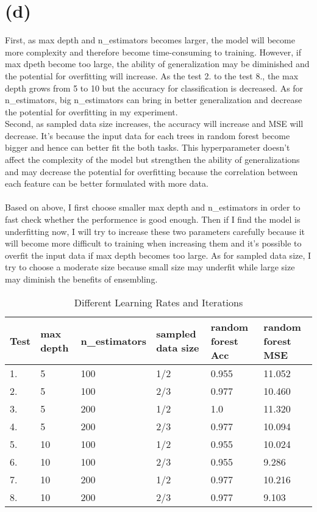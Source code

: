 \documentclass[12pt,a4paper]{article}
\begin{document}
\section*{(d)}
First, as max depth and n\_estimators becomes larger, the model will become more complexity and therefore become time-consuming to training. However, 
if max dpeth become too large, the ability of generalization may be diminished and the potential for overfitting will increase.
As the test 2. to the test 8., the max depth grows from 5 to 10 but the accuracy for classification is decreased. As for n\_estimators,
big n\_estimators can bring in better generalization and decrease the potential for overfitting in my experiment.\\
\newline
Second, as sampled data size increases, the accuracy will increase and MSE will decrease. It's because the input data for each trees in random forest become bigger and hence can better fit the both tasks.
This hyperparameter doesn't affect the complexity of the model but strengthen the ability of generalizations and may decrease the potential for overfitting because the correlation between each feature can be
better formulated with more data.\\
\\
Based on above, I first choose smaller max depth and n\_estimators in order to fast check whether the performence is good enough. Then if I find the model is underfitting now, I will try to increase
these two parameters carefully because it will become more difficult to training when increasing them and it's possible to overfit the input data if max depth becomes too large.
As for sampled data size, I try to choose a moderate size because small size may underfit while large size may diminish the benefits of ensembling.
\begin{table}[htbp]
    \centering
    \caption{Different Learning Rates and Iterations}
    \label{label4}
    \begin{tabular}[t]{l|lllll}
    \hline
    Test & max depth & n\_estimators & sampled data size & random forest Acc & random forest MSE\\
    \hline
    1. & 5 & 100 & 1/2 & 0.955 & 11.052 \\
    2. &5 & 100 & 2/3 & 0.977 & 10.460 \\
    3. &5 & 200 & 1/2 & 1.0 & 11.320 \\
    4. &5 & 200 & 2/3 & 0.977 & 10.094 \\
    5. &10 & 100 & 1/2 & 0.955 & 10.024 \\
    6. &10 & 100 & 2/3 & 0.955 & 9.286 \\
    7. &10 & 200 & 1/2 & 0.977 & 10.216 \\
    8. &10 & 200 & 2/3 & 0.977 & 9.103 \\
    \hline
    \end{tabular}
\end{table}
\end{document}
